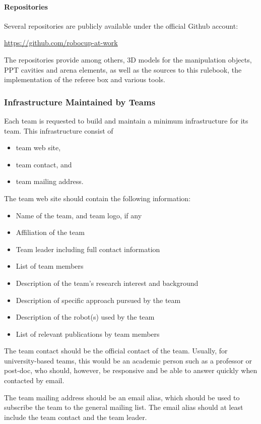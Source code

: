 \paragraph{Repositories}
Several repositories are publicly available under the official \RCAW Github account:
\begin{center}
\url{https://github.com/robocup-at-work}
\end{center}

The repositories provide among others, 3D models for the manipulation objects, PPT cavities and arena elements, as well as the sources to this rulebook, the implementation of the referee box and various tools.


\subsubsection{Infrastructure Maintained by Teams}
Each team is requested to build and maintain a minimum infrastructure for its team. This infrastructure consist of

\begin{itemize}
	\item team web site,
	\item team contact, and
	\item team mailing address.
\end{itemize}

The team web site should contain the following information:

\begin{itemize}
	\item Name of the team, and team logo, if any
	\item Affiliation of the team
	\item Team leader including full contact information
	\item List of team members
	\item Description of the team's research interest and background
	\item Description of specific approach pursued by the team
	\item Description of the robot(s) used by the team
	\item List of relevant publications by team members

\end{itemize}

The team contact should be the official contact of the team. Usually, for university-based teams, this would be an academic person such as a professor or post-doc, who should, however, be responsive and be able to answer quickly when contacted by email.
\par
The team mailing address should be an email alias, which should be used to subscribe the team to the general \RCAW mailing list. The email alias should at least include the team contact and the team leader.
